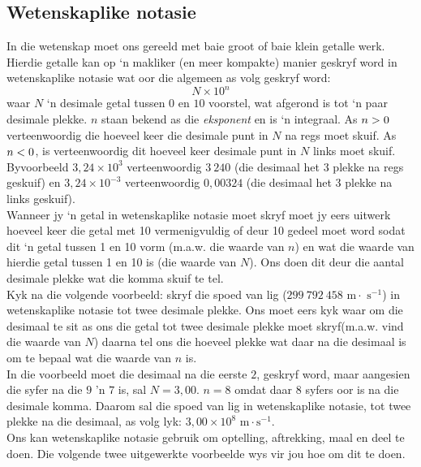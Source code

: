 \subsection*{Wetenskaplike notasie}
In die wetenskap moet ons gereeld met baie groot of baie klein getalle werk. Hierdie getalle kan op ‘n makliker (en meer kompakte) manier geskryf word in wetenskaplike notasie wat oor die algemeen as volg geskryf word:      
    \begin{equation*}
    N \times 10^{n}
      \end{equation*}
waar $N$ ‘n desimale getal tussen $0$ en $10$ voorstel, wat afgerond is tot ‘n paar desimale plekke. $n$ staan bekend as die \textsl{eksponent} en is ‘n integraal. As $n>{}0$ verteenwoordig die hoeveel keer die desimale punt in $N$ na regs moet skuif. As $n<{}0$, is verteenwoordig dit hoeveel keer desimale punt in $N$ links moet skuif. Byvoorbeeld $3,24\ensuremath{\times}{10}^{3}$ verteenwoordig $3~240$ (die desimaal het 3 plekke na regs geskuif) en $3,24\ensuremath{\times}{10}^{-3}$ verteenwoordig $0,00324$ (die desimaal het 3 plekke na links geskuif).\\
Wanneer jy ‘n getal in wetenskaplike notasie moet skryf moet jy eers uitwerk hoeveel keer die getal met 10 vermenigvuldig of deur 10 gedeel moet word sodat dit ‘n getal tussen 1 en 10 vorm (m.a.w. die waarde van $n$) en wat die waarde van hierdie getal tussen 1 en 10 is (die waarde van $N$). Ons doen dit deur die aantal desimale plekke wat die komma skuif te tel.\\
Kyk na die volgende voorbeeld: skryf die spoed van lig ($299 ~792 ~458 \text{ m} \cdot \text{ s}^{-1}$) in wetenskaplike notasie tot twee desimale plekke. Ons moet eers kyk waar om die desimaal te sit as ons die getal tot twee desimale plekke moet skryf(m.a.w. vind die waarde van $N$) daarna tel ons die hoeveel plekke wat daar na die desimaal is om te bepaal wat die waarde van $n$ is.\\
In die voorbeeld moet die desimaal na die eerste $2$, geskryf word, maar aangesien die syfer na die $9$ 'n $7$ is, sal $N=3,00$. $n=8$ omdat daar $8$ syfers oor is na die desimale komma. Daarom sal die spoed van lig in wetenskaplike notasie, tot twee plekke na die desimaal, as volg lyk: $3,00 \times 10^{8} \text{ m} \cdot \text{s}^{-1}$. \\
Ons kan wetenskaplike notasie gebruik om optelling, aftrekking, maal en deel te doen. Die volgende twee uitgewerkte voorbeelde wys vir jou hoe om dit te doen.
